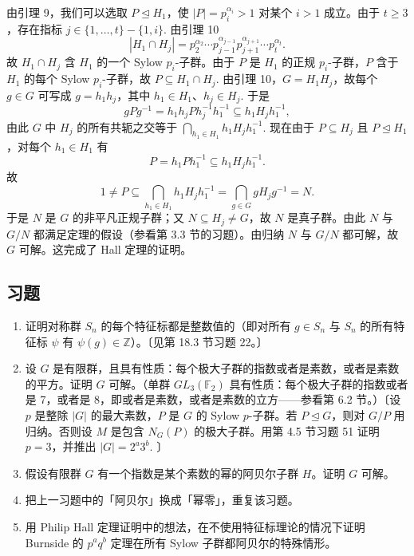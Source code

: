 由引理 9，我们可以选取 \(P \trianglelefteq H_1\)，使 \(|P| = p_i^{\alpha_i} > 1\) 对某个 \(i > 1\) 成立。由于 \(t \geq 3\)，存在指标 \(j \in \{1, \ldots, t\} - \{1, i\}\). 由引理 10
\[
|H_1 \cap H_j| = p_2^{\alpha_2}\cdots p_{j-1}^{\alpha_{j-1}}p_{j+1}^{\alpha_{j+1}}\cdots p_t^{\alpha_t}.
\]
故 \(H_1 \cap H_j\) 含 \(H_1\) 的一个 Sylow \(p_i\)-子群。由于 \(P\) 是 \(H_1\) 的正规 \(p_i\)-子群，\(P\) 含于 \(H_1\) 的每个 Sylow \(p_i\)-子群，故 \(P \subseteq H_1 \cap H_j\). 由引理 10，\(G = H_1H_j\)，故每个 \(g \in G\) 可写成 \(g = h_1h_j\)，其中 \(h_1 \in H_1\)、\(h_j \in H_j\). 于是
\[
gPg^{-1} = h_1h_jPh_j^{-1}h_1^{-1} \subseteq h_1H_jh_1^{-1},
\]
由此 \(G\) 中 \(H_j\) 的所有共轭之交等于 \(\bigcap_{h_1 \in H_1}h_1H_jh_1^{-1}\). 现在由于 \(P \subseteq H_j\) 且 \(P \trianglelefteq H_1\)，对每个 \(h_1 \in H_1\) 有
\[
P = h_1Ph_1^{-1} \subseteq h_1H_jh_1^{-1}.
\]
故
\[
1 \neq P \subseteq \bigcap_{h_1 \in H_1}h_1H_jh_1^{-1} = \bigcap_{g \in G}gH_jg^{-1} = N.
\]
于是 \(N\) 是 \(G\) 的非平凡正规子群；又 \(N \subseteq H_j \neq G\)，故 \(N\) 是真子群。由此 \(N\) 与 \(G/N\) 都满足定理的假设（参看第 3.3 节的习题）。由归纳 \(N\) 与 \(G/N\) 都可解，故 \(G\) 可解。这完成了 Hall 定理的证明。

\subsection*{习题}

\begin{enumerate}
\item 证明对称群 \(S_n\) 的每个特征标都是整数值的（即对所有 \(g \in S_n\) 与 \(S_n\) 的所有特征标 \(\psi\) 有 \(\psi(g) \in \mathbb{Z}\)）。〔见第 18.3 节习题 22。〕

\item 设 \(G\) 是有限群，且具有性质：每个极大子群的指数或者是素数，或者是素数的平方。证明 \(G\) 可解。（单群 \(GL_3(\mathbb{F}_2)\) 具有性质：每个极大子群的指数或者是 7，或者是 8，即或者是素数，或者是素数的立方——参看第 6.2 节。）〔设 \(p\) 是整除 \(|G|\) 的最大素数，\(P\) 是 \(G\) 的 Sylow \(p\)-子群。若 \(P \trianglelefteq G\)，则对 \(G/P\) 用归纳。否则设 \(M\) 是包含 \(N_G(P)\) 的极大子群。用第 4.5 节习题 51 证明 \(p = 3\)，并推出 \(|G| = 2^a3^b\).  〕

\item 假设有限群 \(G\) 有一个指数是某个素数的幂的阿贝尔子群 \(H\)。证明 \(G\) 可解。

\item 把上一习题中的「阿贝尔」换成「幂零」，重复该习题。

\item 用 Philip Hall 定理证明中的想法，在不使用特征标理论的情况下证明 Burnside 的 \(p^aq^b\) 定理在所有 Sylow 子群都阿贝尔的特殊情形。
\end{enumerate}

